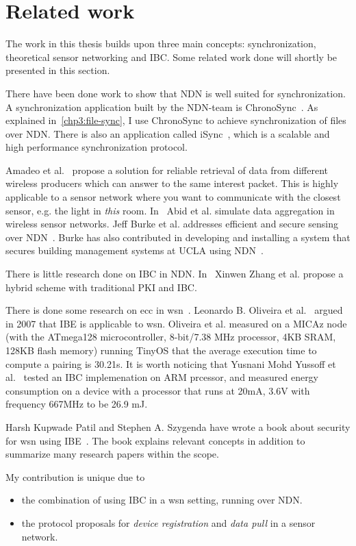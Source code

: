 \section{Related work}
The work in this thesis builds upon three main concepts: synchronization, theoretical sensor networking and \gls{IBC}. 
Some related work done will shortly be presented in this section.

There have been done work to show that \gls{NDN} is well suited for synchronization. 
A synchronization application built by the \gls{NDN}-team is ChronoSync~\cite{DBLP:conf/icnp/ZhuA13}.
As explained in~\autoref{chp3:file-sync}, I use ChronoSync to achieve synchronization of files over \gls{NDN}.
There is also an application called iSync~\cite{DBLP:conf/acmicn/FuAC14}, which is a scalable and high performance synchronization protocol.

Amadeo et al.~\cite{DBLP:conf/acmicn/AmadeoCM14} propose a solution for reliable retrieval of \gls{data} from different wireless producers which can answer to the same \gls{interest} packet. This is highly applicable to a sensor network where you want to communicate with the closest sensor, e.g. the light in \textit{this} room.
In~\cite{DBLP:conf/noms/AbidySLF14} Abid et al. simulate \gls{data} aggregation in wireless sensor networks.
Jeff Burke et al. addresses efficient and secure sensing over \gls{NDN}~\cite{DBLP:conf/nca/BurkeGNT14}.
Burke has also contributed in developing and installing a system that secures building management systems at \gls{UCLA} using \gls{NDN}~\cite{DBLP:journals/network/ShangDMBZ14}.

There is little research done on \gls{IBC} in \gls{NDN}. 
In~\cite{DBLP:conf/icnp/ZhangCXWSW11} Xinwen Zhang et al. propose a hybrid scheme with traditional \gls{PKI} and \gls{IBC}.

There is done some research on \gls{ecc} in \gls{wsn}~\cite{DBLP:conf/ipsn/LiuN08, DBLP:conf/ewsn/SzczechowiakOSCD08}.
Leonardo B. Oliveira et al.~\cite{DBLP:journals/iacr/OliveiraAMDLD07} argued in 2007 that \gls{IBE} is applicable to \gls{wsn}.
Oliveira et al. measured on a MICAz node (with the ATmega128 microcontroller, 8-bit/7.38 MHz processor, 4KB SRAM, 128KB flash memory) running TinyOS that the average execution time to compute a pairing is 30.21s. 
It is worth noticing that Yusnani Mohd Yussoff et al.~\cite{DBLP:journals/corr/abs-1207-6185} tested an \gls{IBC} implemenation on ARM prcessor, and measured energy consumption on a device with a processor that runs at 20mA, 3.6V with frequency 667MHz to be 26.9 mJ.

Harsh Kupwade Patil and Stephen A. Szygenda have wrote a book about security for \gls{wsn} using \gls{IBE}~\cite{Patil:2012:SWS:2464778}.
The book explains relevant concepts in addition to summarize many research papers within the scope.

My contribution is unique due to 
\begin{itemize}
  \item the combination of using \gls{IBC} in a \gls{wsn} setting, running over \gls{NDN}.
  \item the protocol proposals for \textit{device registration} and \textit{data pull} in a sensor network.
\end{itemize}